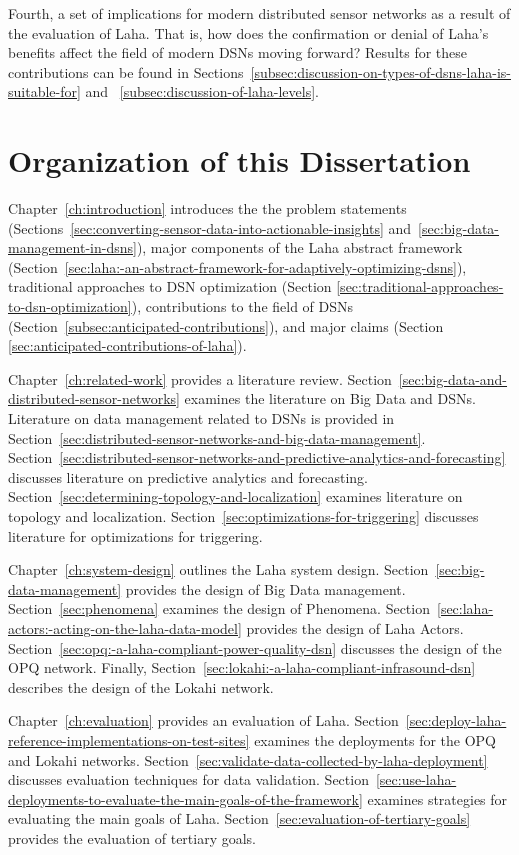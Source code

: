 Fourth, a set of implications for modern distributed sensor networks as a result of the evaluation of Laha. That is, how does the confirmation or denial of Laha's benefits affect the field of modern DSNs moving forward? Results for these contributions can be found in Sections~\ref{subsec:discussion-on-types-of-dsns-laha-is-suitable-for} and ~\ref{subsec:discussion-of-laha-levels}.

\section{Organization of this Dissertation}\label{subsec:organization-of-this-dissertation}

Chapter~\ref{ch:introduction} introduces the the problem statements (Sections~\ref{sec:converting-sensor-data-into-actionable-insights} and~\ref{sec:big-data-management-in-dsns}), major components of the Laha abstract framework (Section~\ref{sec:laha:-an-abstract-framework-for-adaptively-optimizing-dsns}), traditional approaches to DSN optimization (Section \ref{sec:traditional-approaches-to-dsn-optimization}), contributions to the field of DSNs (Section~\ref{subsec:anticipated-contributions}), and major claims (Section \ref{sec:anticipated-contributions-of-laha}).

Chapter~\ref{ch:related-work} provides a literature review. Section~\ref{sec:big-data-and-distributed-sensor-networks} examines the literature on Big Data and DSNs. Literature on data management related to DSNs is provided in Section~\ref{sec:distributed-sensor-networks-and-big-data-management}. Section~\ref{sec:distributed-sensor-networks-and-predictive-analytics-and-forecasting} discusses literature on predictive analytics and forecasting. Section~\ref{sec:determining-topology-and-localization} examines literature on topology and localization. Section~\ref{sec:optimizations-for-triggering} discusses literature for optimizations for triggering.

Chapter~\ref{ch:system-design} outlines the Laha system design. Section~\ref{sec:big-data-management} provides the design of Big Data management. Section~\ref{sec:phenomena} examines the design of Phenomena. Section~\ref{sec:laha-actors:-acting-on-the-laha-data-model} provides the design of Laha Actors. Section~\ref{sec:opq:-a-laha-compliant-power-quality-dsn} discusses the design of the OPQ network. Finally, Section~\ref{sec:lokahi:-a-laha-compliant-infrasound-dsn} describes the design of the Lokahi network.

Chapter~\ref{ch:evaluation} provides an evaluation of Laha. Section~\ref{sec:deploy-laha-reference-implementations-on-test-sites} examines the deployments for the OPQ and Lokahi networks. Section~\ref{sec:validate-data-collected-by-laha-deployment} discusses evaluation techniques for data validation. Section~\ref{sec:use-laha-deployments-to-evaluate-the-main-goals-of-the-framework} examines strategies for evaluating the main goals of Laha. Section~\ref{sec:evaluation-of-tertiary-goals} provides the evaluation of tertiary goals.


